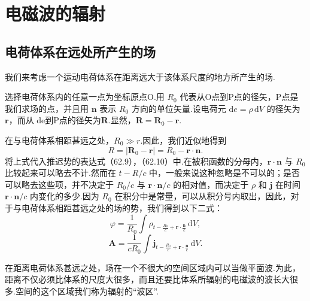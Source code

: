 \chapter{电磁波的辐射}

\section{电荷体系在远处所产生的场}

我们来考虑一个运动电荷体系在距离远大于该体系尺度的地方所产生的场.

选择电荷体系内的任意一点为坐标原点O.用 $R_0$ 代表从O点到P点的径矢，P点是我们求场的点，并且用 $\boldsymbol{n}$ 表示 $R_0$ 方向的单位矢量.设电荷元 $\mathrm{d}e=\rho\,\mathrm{d}V$ 的径矢为 $\boldsymbol{r}$，而从 de到P点的径矢为$\boldsymbol{R}$.显然，$\boldsymbol{R}=\boldsymbol{R}_0-\boldsymbol{r}$.

在与电荷体系相距甚远之处，$R_0\gg r$.因此，我们近似地得到
\begin{equation*}
  R=|\boldsymbol{R}_0-\boldsymbol{r}|=R_0-\boldsymbol{r}\cdot\boldsymbol{n}.
\end{equation*}
将上式代入推迟势的表达式（62.9），（62.10）中.在被积函数的分母内，$\boldsymbol{r}\cdot\boldsymbol{n}$ 与 $R_0$ 比较起来可以略去不计.然而在 $t-R/c$ 中，一般来说这种忽略是不可以的；是否可以略去这些项，并不决定于 $R_0/c$ 与 $\boldsymbol{r}\cdot\boldsymbol{n}/c$ 的相对值，而决定于 $\rho$ 和 $\boldsymbol{j}$ 在时间 $\boldsymbol{r}\cdot\boldsymbol{n}/c$ 内变化的多少.因为 $R_0$ 在积分中是常量，可以从积分号内取出，因此，对于与电荷体系相距甚远之处的场的势，我们得到以下二式：
\begin{equation}
  \varphi=\frac{1}{R_0}\int\rho_{t-\frac{R_0}{c}+\boldsymbol{r}\cdot\frac{\boldsymbol{n}}{c}}\,\mathrm{d}V,
\end{equation}
\begin{equation}
  \boldsymbol{A}=\frac{1}{cR_0}\int\boldsymbol{j}_{t-\frac{R_0}{c}+\boldsymbol{r}\cdot\frac{\boldsymbol{n}}{c}}\,\mathrm{d}V.
\end{equation}

在距离电荷体系甚远之处，场在一个不很大的空间区域内可以当做平面波.为此，距离不仅必须比体系的尺度大很多，而且还要比体系所辐射的电磁波的波长大很多.空间的这个区域我们称为辐射的“波区”.

